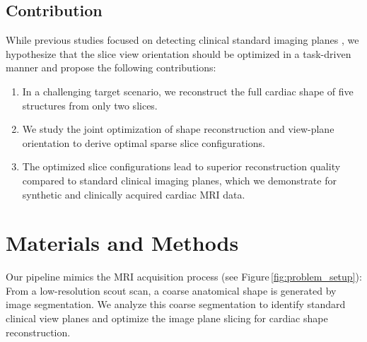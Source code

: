     \subsection{Contribution}
    \label{sec:contribution}
    While previous studies focused on detecting clinical standard imaging planes \cite{beetz2022reconstructing,natalia2022automated,nitta2014automatic}, we hypothesize that the slice view orientation should be optimized in a task-driven manner and propose the following contributions:

    \begin{enumerate}
        \item In a challenging target scenario, we reconstruct the full cardiac shape of five structures from only two slices.
        \item We study the joint optimization of shape reconstruction and view-plane orientation to derive optimal sparse slice configurations.
        \item The optimized slice configurations lead to superior reconstruction quality compared to standard clinical imaging planes, which we demonstrate for synthetic and clinically acquired cardiac MRI data.
    \end{enumerate}

\section{Materials and Methods}
    \label{sec:method}
     Our pipeline mimics the MRI acquisition process (see Figure\,\ref{fig:problem_setup}): From a low-resolution scout scan, a coarse anatomical shape is generated by image segmentation.
    We analyze this coarse segmentation to identify standard clinical view planes and optimize the image plane slicing for cardiac shape reconstruction.
